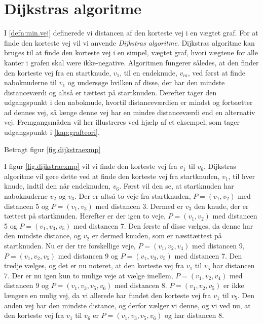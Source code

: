 \section{Dijkstras algoritme}
I \ref{defn:min.vej} definerede vi distancen af den korteste vej i en vægtet graf. For at finde den korteste vej vil vi anvende \emph{Dijkstras algoritme}. Dijkstras algoritme kan bruges til at finde den korteste vej i en simpel, vægtet graf, hvori vægtene for alle kanter i grafen skal være ikke-negative. Algoritmen fungerer således, at den finder den korteste vej fra en startknude, $v_{1}$, til en endeknude, $v_{m}$, ved først at finde naboknuderne til $v_{1}$ og undersøge hvilken af disse, der har den mindste distanceværdi og altså er tættest på startknuden. Derefter tager den udgangspunkt i den naboknude, hvortil distanceværdien er mindst og fortsætter ad dennes vej, så længe denne vej har en mindre distanceværdi end en alternativ vej. Fremgangsmåden vil her illustreres ved hjælp af et eksempel, som tager udgangspunkt i \ref{kap:grafteori}.

\begin{exmp}
Betragt figur \ref{fig.dijkstraexmp}

I figur \ref{fig.dijkstraexmp} vil vi finde den korteste vej fra $v_{1}$ til $v_{6}$. Dijkstras algoritme vil gøre dette ved at finde den korteste vej fra startknuden, $v_{1}$, til hver knude, indtil den når endeknuden, $v_{6}$. Først vil den se, at startknuden har naboknuderne $v_{2}$ og $v_{3}$. Der er altså to veje fra startknuden, $P=(v_{1},v_{2})$ med distancen 5 og $P=(v_{1},v_{3})$ med distancen 3. Dermed er $v_{3}$ den knude, der er tættest på startknuden. Herefter er der igen to veje, $P=(v_{1},v_{2})$ med distancen 5 og $P=(v_{1},v_{3},v_{5})$ med distancen 7. Den første af disse vælges, da denne har den mindste distance, og $v_{2}$ er dermed knuden, som er næsttættest på startknuden. Nu er der tre forskellige veje, $P=(v_{1},v_{2}, v_{4})$ med distancen 9, $P=(v_{1},v_{2}, v_{5})$ med distancen 9 og $P=(v_{1},v_{3}, v_{5})$ med distancen 7. Den tredje vælges, og det er nu noteret, at den korteste vej fra $v_{1}$ til $v_{5}$ har distancen 7. Der er nu igen kun to mulige veje at vælge imellem, $P=(v_{1},v_{2}, v_{4})$ med distancen 9 og $P=(v_{1},v_{3}, v_{5}, v_{6})$ med distancen 8. $P=(v_{1},v_{2}, v_{5})$ er ikke længere en mulig vej, da vi allerede har fundet den korteste vej fra $v_{1}$ til $v_{5}$. Den anden vej har den mindste distance, og derfor vælger vi denne, og vi ved nu, at den korteste vej fra $v_{1}$ til $v_{6}$ er $P=(v_{1},v_{3}, v_{5}, v_{6})$ og har distancen 8.
\end{exmp}

